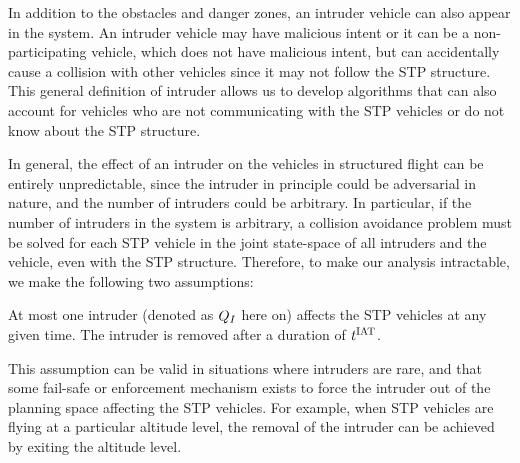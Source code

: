 In addition to the obstacles and danger zones, an intruder vehicle can also appear in the system. An intruder vehicle may have malicious intent or it can be a non-participating vehicle, which does not have malicious intent, but can accidentally cause a collision with other vehicles since it may not follow the STP structure. This general definition of intruder allows us to develop algorithms that can also account for vehicles who are not communicating with the STP vehicles or do not know about the STP structure. 

In general, the effect of an intruder on the vehicles in structured flight can be entirely unpredictable, since the intruder in principle could be adversarial in nature, and the number of intruders could be arbitrary. In particular, if the number of intruders in the system is arbitrary, a collision avoidance problem must be solved for each STP vehicle in the joint state-space of all intruders and the vehicle, even with the STP structure. Therefore, to make our analysis intractable, we make the following two assumptions: 
\begin{assumption}
\label{as:avoidOnce}
At most one intruder (denoted as $Q_I$ here on) affects the STP vehicles at any given time. The intruder is removed after a duration of $t^\text{IAT}$. 
\end{assumption}    
 This assumption can be valid in situations where intruders are rare, and that some fail-safe or enforcement mechanism exists to force the intruder out of the planning space affecting the STP vehicles. For example, when STP vehicles are flying at a particular altitude level, the removal of the intruder can be achieved by exiting the altitude level.
 
